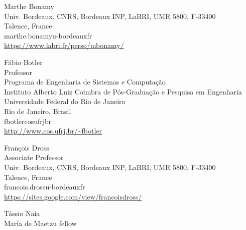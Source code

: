 \documentclass{aic}
\begin{document}

\begin{aicauthors}
\begin{authorinfo}[bonamy]
  Marthe Bonamy\\
  Univ. Bordeaux, CNRS, Bordeaux INP, LaBRI, UMR 5800, F-33400\\
  Talence, France\\
  marthe.bonamy\imageat{}u-bordeaux\imagedot{}fr \\
  \url{https://www.labri.fr/perso/mbonamy/}
\end{authorinfo}
\begin{authorinfo}[botler]
  F\'abio Botler\\
  Professor\\
  Programa de Engenharia de Sistemas e Computa\c c\~ao \\
	Instituto Alberto Luiz Coimbra de P\'os-Gradua\c c\~ao e Pesquisa em Engenharia \\
	Universidade Federal do Rio de Janeiro \\
	Rio de Janeiro, Brasil\\
  fbotler\imageat{}cos\imagedot{}ufrj\imagedot{}br \\
  \url{http://www.cos.ufrj.br/~fbotler}
\end{authorinfo}
\begin{authorinfo}[dross]
  François Dross\\
  Associate Professor \\
  Univ. Bordeaux, CNRS, Bordeaux INP, LaBRI, UMR 5800, F-33400\\
  Talence, France\\
  francois.dross\imageat{}u-bordeaux\imagedot{}fr \\
  \url{https://sites.google.com/view/francoisdross/}
\end{authorinfo}
\begin{authorinfo}[naia]
  T\'assio Naia\\
  María de Maetzu fellow \\

\end{authorinfo}
\end{aicauthors}
\end{document}
